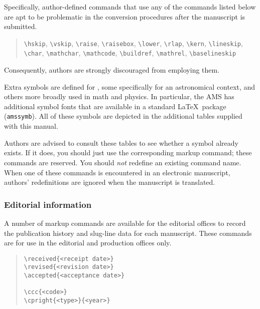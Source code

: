 \documentclass[preprint2]{aastex}
\begin{document}
Specifically, author-defined commands that use any of the commands 
listed below are apt to be problematic in the conversion 
procedures after the manuscript is submitted. 
\begin{quote} 
\verb"\hskip", \verb"\vskip", 
\verb"\raise", \verb"\raisebox", 
\verb"\lower", \verb"\rlap", 
\verb"\kern", \verb"\lineskip", 
\verb"\char", \verb"\mathchar", 
\verb"\mathcode", \verb"\buildref", 
\verb"\mathrel", \verb"\baselineskip" 
\end{quote} 
Consequently, authors are strongly discouraged from 
employing them. 
 
Extra symbols are defined for \aastex, 
some specifically for an astronomical context, and others more 
broadly used in math and physics. 
In particular, the AMS has additional symbol fonts that are 
available in a standard \LaTeX\ package (\verb"amssymb"). 
All of these symbols are depicted in the additional tables 
supplied with this manual. 
 
Authors are advised to consult these tables to see whether a 
symbol already exists.  If it does, you should just use the 
corresponding markup command; these commands are reserved. 
You should \emph{not} redefine an existing command name. 
When one of these commands is encountered in an electronic 
manuscript, authors' redefinitions are ignored when the 
manuscript is translated. 
 
\subsubsection{Editorial information} 
 
A number of markup commands are available for the 
editorial offices to record the publication history and slug-line data 
for each manuscript. 
These commands are for use in the editorial and production offices only. 
\begin{quote} 
\begin{verbatim} 
\received{<receipt date>} 
\revised{<revision date>} 
\accepted{<acceptance date>} 
 
\ccc{<code>} 
\cpright{<type>}{<year>} 
\end{verbatim} 
\end{quote} 
 
\end{document}
